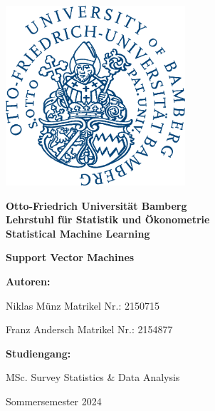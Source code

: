 \begin{titlepage}
	\begin{center}
		
		\includegraphics[width=0.5\textwidth]{images/UB-Logo-blau.png}
		
		\LARGE
		\textbf{Otto-Friedrich Universität Bamberg}\\
		\textbf{Lehrstuhl für Statistik und Ökonometrie}\\
		\textbf{Statistical Machine Learning}
		
		
		\vspace*{1.5cm}
		
		\Huge
		\textbf{Support Vector Machines}
		
		
		\vspace{2cm}
		
		\Large
		\begin{minipage}[t]{0.4\textwidth}
			\textbf{Autoren:}
		\end{minipage}
		\hfill
		\begin{minipage}[t]{0.3\textwidth}
			Niklas Münz\newline
			Matrikel Nr.: 2150715
			
			\vspace{0.3cm}
			
			Franz Andersch\newline
			Matrikel Nr.: 2154877
			
		\end{minipage}
		
		\vspace{0.5cm}
		
		\Large
		\begin{minipage}[t]{0.4\textwidth}
			\textbf{Studiengang:}
		\end{minipage}
		\hfill
		\begin{minipage}[t]{0.3\textwidth}
			MSc. Survey Statistics \newline
			\& Data Analysis
		\end{minipage}
		
		\vfill
		Sommersemester 2024
		
	\end{center}
\end{titlepage}